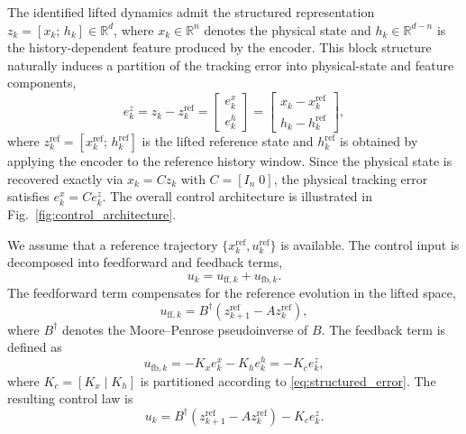\documentclass[journal]{IEEEtran}
\begin{document}
The identified lifted dynamics admit the structured representation $z_k = [x_k;\, h_k] \in \mathbb{R}^d$, where $x_k \in \mathbb{R}^n$ denotes the physical state and $h_k \in \mathbb{R}^{d-n}$ is the history-dependent feature produced by the encoder. This block structure naturally induces a partition of the tracking error into physical-state and feature components,
\begin{equation}
    e_k^z = z_k - z_k^{\mathrm{ref}}
    = \begin{bmatrix} e_k^x \\ e_k^h \end{bmatrix}
    = \begin{bmatrix} x_k - x_k^{\mathrm{ref}} \\ h_k - h_k^{\mathrm{ref}} \end{bmatrix},
    \label{eq:structured_error}
\end{equation}
where $z_k^{\mathrm{ref}} = [x_k^{\mathrm{ref}};\, h_k^{\mathrm{ref}}]$ is the lifted reference state and $h_k^{\mathrm{ref}}$ is obtained by applying the encoder to the reference history window. Since the physical state is recovered exactly via $x_k = C z_k$ with $C = [I_n\;0]$, the physical tracking error satisfies $e_k^x = C e_k^z$. The overall control architecture is illustrated in Fig.~\ref{fig:control_architecture}.

We assume that a reference trajectory $\{x_k^{\mathrm{ref}}, u_k^{\mathrm{ref}}\}$ is available. The control input is decomposed into feedforward and feedback terms,
\begin{equation}
    u_k = u_{\mathrm{ff},k} + u_{\mathrm{fb},k}.
    \label{eq:ctrl_decomp}
\end{equation}
The feedforward term compensates for the reference evolution in the lifted space,
\begin{equation}
    u_{\mathrm{ff},k} = B^\dagger\!\left(z_{k+1}^{\mathrm{ref}} - A z_k^{\mathrm{ref}}\right),
    \label{eq:feedforward}
\end{equation}
where $B^\dagger$ denotes the Moore--Penrose pseudoinverse of $B$. The feedback term is defined as
\begin{equation}
    u_{\mathrm{fb},k} = -K_x e_k^x - K_h e_k^h = -K_c e_k^z,
    \label{eq:hierarchical_fb}
\end{equation}
where $K_c = [K_x\;|\;K_h]$ is partitioned according to \eqref{eq:structured_error}. The resulting control law is
\begin{equation}
    u_k = B^\dagger\!\left(z_{k+1}^{\mathrm{ref}} - A z_k^{\mathrm{ref}}\right) - K_c e_k^z.
    \label{eq:full_ctrl}
\end{equation}
\end{document}
